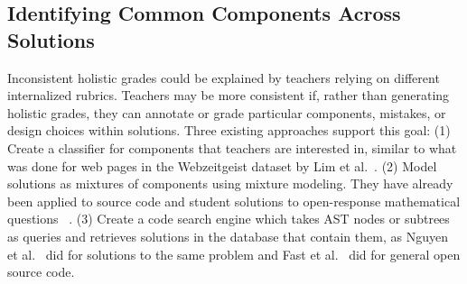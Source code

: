 





\subsection{Identifying Common Components Across Solutions}

Inconsistent holistic grades could be explained by teachers relying on different internalized rubrics. Teachers may be more consistent if, rather than generating holistic grades, they can annotate or grade particular components, mistakes, or design choices within solutions. Three existing approaches support this goal: (1) Create a classifier for components that teachers are interested in, similar to what was done for web pages in the Webzeitgeist dataset by Lim et al.~\cite{lim2012learning}. (2) Model solutions as mixtures of components using mixture modeling. They have already been applied to source code and student solutions to open-response mathematical questions ~\cite{binkley2014understanding,Linstead}. (3) Create a code search engine which takes AST nodes or subtrees as queries and retrieves solutions in the database that contain them, as Nguyen et al.~\cite{codewebs} did for solutions to the same problem and Fast et al.~\cite{codex} did for general open source code.


